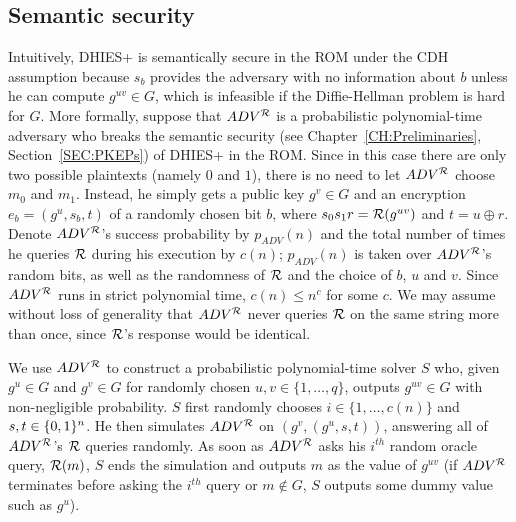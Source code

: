 \subsection{Semantic security}
\label{SEC:Semantic}
Intuitively, DHIES+ is semantically secure in the ROM under the CDH assumption
because $s_b$ provides the adversary with no information about $b$ unless he
can compute $g^{uv} \in G$, which is infeasible if the Diffie-Hellman problem
is hard for $G$. More formally, suppose that $ADV^{\mathcal{R}}$ is a probabilistic
polynomial-time adversary who breaks the semantic security (see
Chapter~\ref{CH:Preliminaries}, Section~\ref{SEC:PKEPs}) of DHIES+ in the ROM. 
Since in this case there are only two possible plaintexts (namely $0$ and
$1$), there is no need to let $ADV^{\mathcal{R}}$ choose $m_0$ and $m_1$. Instead, he
simply gets a public key $g^v \in G$ and an encryption $e_b = (g^{u}, s_b, t)$
of a randomly chosen bit $b$, where $s_0s_1r = \mathcal{R}(g^{uv})$ and $t = u
\oplus r$.  Denote $ADV^{\mathcal{R}}$'s success probability by
$p_{ADV}(n)$ and the total number of times he queries $\mathcal{R}$ during his
execution by $c(n)$; $p_{ADV}(n)$ is taken over $ADV^{\mathcal{R}}$'s random bits,
as well as the randomness of $\mathcal{R}$ and the choice of $b$, $u$ and $v$. Since
$ADV^{\mathcal{R}}$ runs in strict polynomial time, $c(n) \leq n^c$ for some $c$. 
We may assume without loss of generality that $ADV^{\mathcal{R}}$ never queries
$\mathcal{R}$ on the same string more than once, since $\mathcal{R}$'s response would be
identical.

We use $ADV^{\mathcal{R}}$ to construct a probabilistic polynomial-time solver $S$
who, given $g^u \in G$ and $g^v \in G$ for randomly chosen $u,v \in
\{1,\ldots,q\}$, outputs $g^{uv} \in G$ with non-negligible probability.
$S$ first
randomly chooses $i \in \{1,\ldots,c(n)\}$ and $s,t \in \{0,1\}^{n}$. He then
simulates $ADV^{\mathcal{R}}$ on $(g^v, (g^u, s, t))$, answering all of $ADV^{\mathcal{R}}$'s
$\mathcal{R}$ queries randomly. As soon as $ADV^{\mathcal{R}}$ asks his $i^{th}$ random
oracle query, $\mathcal{R}(m)$, $S$ ends the simulation and outputs $m$ as the value
of $g^{uv}$ (if $ADV^{\mathcal{R}}$ terminates before asking the $i^{th}$ query or $m
\notin G$, $S$ outputs some dummy value such as $g^u$). 

